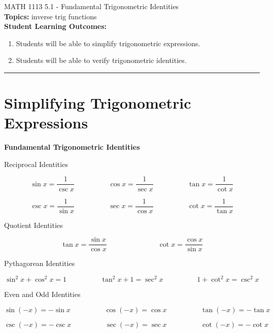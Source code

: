 \documentclass[11pt]{article}
\newcommand{\boxcolor}{gray!30}
\newenvironment{boxthm}{\begin{mdframed}[backgroundcolor=\boxcolor,nobreak=true]}{\end{mdframed}}
\begin{document}
\noindent MATH 1113   \hfill 5.1 - Fundamental Trigonometric Identities\\



\noindent \textbf{Topics:}  inverse trig functions\\

\noindent \textbf{Student Learning Outcomes:}
\begin{enumerate}
\item Students will be able to simplify trigonometric expressions.
\item Students will be able to verify trigonometric identities.

\end{enumerate}

\hrule 
\vspace{5mm}

\section{Simplifying Trigonometric Expressions}

\begin{boxthm}
{\bf Fundamental Trigonometric Identities}

Reciprocal Identities

$$\sin x =\frac{1}{\csc x} \hspace{2cm}\cos x = \frac{1}{\sec x}\hspace{2cm}\tan x = \frac{1}{\cot x}$$

$$\csc x =\frac{1}{\sin x} \hspace{2cm}\sec x = \frac{1}{\cos x}\hspace{2cm}\cot x = \frac{1}{\tan x}$$

Quotient Identities

$$\tan x = \frac{\sin x}{\cos x} \hspace{3cm} \cot x = \frac{\cos x}{\sin x}$$

Pythagorean Identities

$$\sin^2 x + \cos^2 x=1 \hspace{2cm}\tan^2 x +1 = \sec^2 x \hspace{2cm}1+\cot^2 x = \csc^2 x$$

Even and Odd Identities

$$\sin( -x) =-\sin x\hspace{2cm}\cos( -x) = \cos x\hspace{2cm}\tan(- x) = -\tan x$$

$$\csc( -x) =-\csc x\hspace{2cm}\sec( -x) = \sec x\hspace{2cm}\cot(- x) = -\cot x$$

\end{boxthm}
\end{document}
